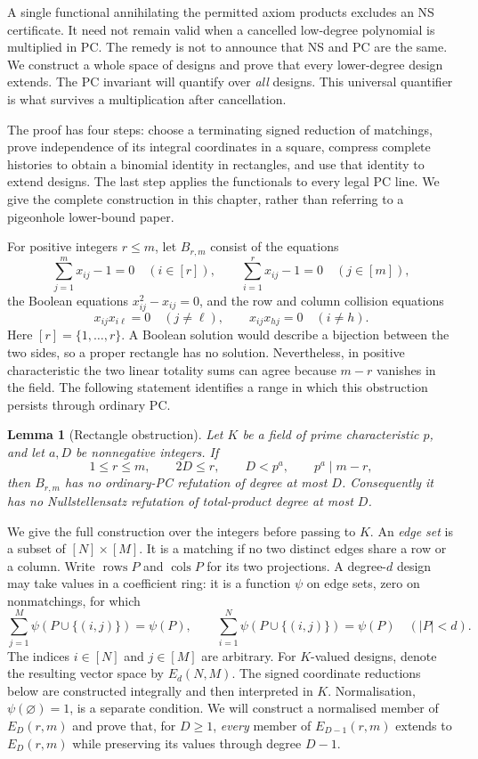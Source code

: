 \documentclass[11pt,a4paper,oneside,openany]{book}
\newtheorem{lemma}[theorem]{Lemma}
\theoremstyle{definition}\newtheorem{definition}[theorem]{Definition}
\theoremstyle{remark}\newtheorem{remark}[theorem]{Remark}
\numberwithin{equation}{chapter}
\begin{document}
A single functional annihilating the permitted axiom products excludes
an NS certificate. It need not remain valid when a cancelled low-degree
polynomial is multiplied in PC. The remedy is not to announce that NS
and PC are the same. We construct a whole space of designs and prove
that every lower-degree design extends. The PC invariant will quantify
over \emph{all} designs. This universal quantifier is what survives a
multiplication after cancellation.

The proof has four steps: choose a terminating signed reduction of
matchings, prove independence of its integral coordinates in a square,
compress complete histories to obtain a binomial identity in rectangles,
and use that identity to extend designs. The last step applies the
functionals to every legal PC line. We give the complete construction
in this chapter, rather than referring to a pigeonhole lower-bound paper.

For positive integers $r\leq m$, let $B_{r,m}$ consist of the equations
\[
 \sum_{j=1}^{m}x_{ij}-1=0\quad(i\in[r]),\qquad
 \sum_{i=1}^{r}x_{ij}-1=0\quad(j\in[m]),
\]
the Boolean equations $x_{ij}^{2}-x_{ij}=0$, and the row and column
collision equations
\[
 x_{ij}x_{i\ell}=0\quad(j\ne\ell),\qquad
 x_{ij}x_{hj}=0\quad(i\ne h).
\]
Here $[r]=\{1,\ldots,r\}$.  A Boolean solution would describe a bijection
between the two sides, so a proper rectangle has no solution.  Nevertheless,
in positive characteristic the two linear totality sums can agree because
$m-r$ vanishes in the field.  The following statement identifies a range
in which this obstruction persists through ordinary PC.

\begin{lemma}[Rectangle obstruction]\label{tx:lem:rectangle-obstruction}
Let $K$ be a field of prime characteristic $p$, and let $a,D$ be
nonnegative integers.  If
\[
 1\leq r\leq m,\qquad 2D\leq r,\qquad D<p^a,
 \qquad p^a\mid m-r,
\]
then $B_{r,m}$ has no ordinary-PC refutation of degree at most $D$.
Consequently it has no Nullstellensatz refutation of total-product degree
at most $D$.
\end{lemma}

We give the full construction over the integers before passing to $K$.
An \emph{edge set} is a subset of $[N]\times[M]$.  It is a matching if
no two distinct edges share a row or a column.  Write $\operatorname{rows}P$
and $\operatorname{cols}P$ for its two projections.  A degree-$d$ design
may take values in a coefficient ring: it is a function $\psi$ on edge
sets, zero on nonmatchings, for which
\begin{equation}\label{tx:eq:matching-design}
 \sum_{j=1}^{M}\psi(P\cup\{(i,j)\})=\psi(P),\qquad
 \sum_{i=1}^{N}\psi(P\cup\{(i,j)\})=\psi(P)
 \quad(|P|<d).
\end{equation}
The indices $i\in[N]$ and $j\in[M]$ are arbitrary. For $K$-valued
designs, denote the resulting vector space by $E_d(N,M)$. The signed
coordinate reductions below are constructed integrally and then
interpreted in $K$.  Normalisation, $\psi(\varnothing)=1$, is a separate
condition.  We will construct a normalised member of $E_D(r,m)$ and prove
that, for $D\ge1$, \emph{every} member of $E_{D-1}(r,m)$ extends to $E_D(r,m)$ while
preserving its values through degree $D-1$.
\end{document}
